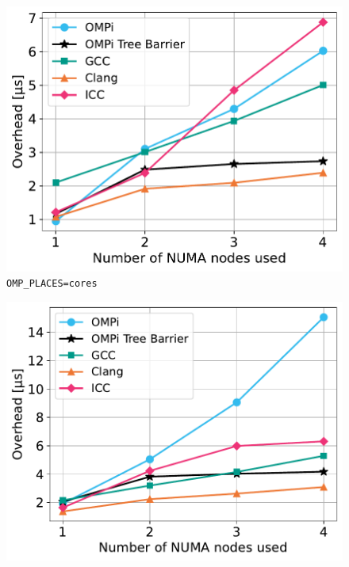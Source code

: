 %

\begin{figure}
    \centering
    \begin{minipage}{0.5\textwidth}
        \centering
        \includegraphics[width=1\textwidth]{Figures/epcc_20210823_175412/default-places_cores_close.pdf}
		\texttt{OMP\_PLACES=cores}
    \end{minipage}\hfill
    \begin{minipage}{0.5\textwidth}
        \centering
        \includegraphics[width=1\textwidth]{Figures/epcc_20210823_175412/default-places_threads_close.pdf}

\end{minipage}
\end{figure}
